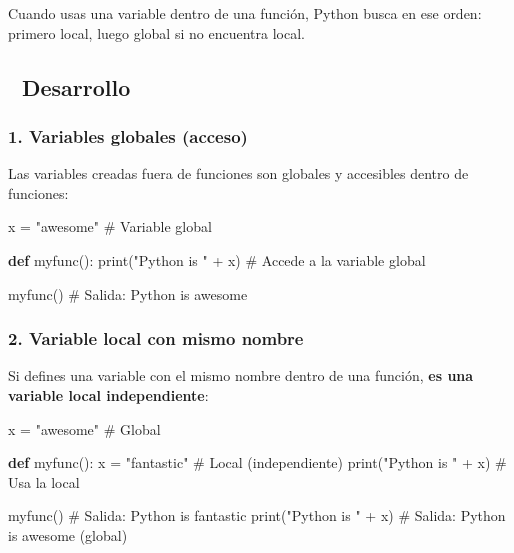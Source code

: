 \documentclass[
  doc,
  floatsintext,
  longtable,
  a4paper,
  nolmodern,
  notxfonts,
  notimes,
  12pt,
  colorlinks=true,linkcolor=blue,citecolor=blue,urlcolor=blue]{apa7}
\newenvironment{Shaded}{\begin{snugshade}}{\end{snugshade}}
\newcommand{\BuiltInTok}[1]{\textcolor[rgb]{0.00,0.23,0.31}{#1}}
\newcommand{\CommentTok}[1]{\textcolor[rgb]{0.37,0.37,0.37}{#1}}
\newcommand{\KeywordTok}[1]{\textcolor[rgb]{0.00,0.23,0.31}{\textbf{#1}}}
\newcommand{\NormalTok}[1]{\textcolor[rgb]{0.00,0.23,0.31}{#1}}
\newcommand{\OperatorTok}[1]{\textcolor[rgb]{0.37,0.37,0.37}{#1}}
\newcommand{\StringTok}[1]{\textcolor[rgb]{0.13,0.47,0.30}{#1}}
\begin{document}
Cuando usas una variable dentro de una función, Python busca en ese
orden: primero local, luego global si no encuentra local.

\subsection{📐 Desarrollo}\label{desarrollo}

\subsubsection{1. Variables globales
(acceso)}\label{variables-globales-acceso}

Las variables creadas fuera de funciones son globales y accesibles
dentro de funciones:

\begin{Shaded}
\begin{Highlighting}[]
\NormalTok{x }\OperatorTok{=} \StringTok{"awesome"}  \CommentTok{\# Variable global}

\KeywordTok{def}\NormalTok{ myfunc():}
    \BuiltInTok{print}\NormalTok{(}\StringTok{"Python is "} \OperatorTok{+}\NormalTok{ x)  }\CommentTok{\# Accede a la variable global}

\NormalTok{myfunc()  }\CommentTok{\# Salida: Python is awesome}
\end{Highlighting}
\end{Shaded}

\subsubsection{2. Variable local con mismo
nombre}\label{variable-local-con-mismo-nombre}

Si defines una variable con el mismo nombre dentro de una función,
\textbf{es una variable local independiente}:

\begin{Shaded}
\begin{Highlighting}[]
\NormalTok{x }\OperatorTok{=} \StringTok{"awesome"}  \CommentTok{\# Global}

\KeywordTok{def}\NormalTok{ myfunc():}
\NormalTok{    x }\OperatorTok{=} \StringTok{"fantastic"}  \CommentTok{\# Local (independiente)}
    \BuiltInTok{print}\NormalTok{(}\StringTok{"Python is "} \OperatorTok{+}\NormalTok{ x)  }\CommentTok{\# Usa la local}

\NormalTok{myfunc()  }\CommentTok{\# Salida: Python is fantastic}
\BuiltInTok{print}\NormalTok{(}\StringTok{"Python is "} \OperatorTok{+}\NormalTok{ x)  }\CommentTok{\# Salida: Python is awesome (global)}
\end{Highlighting}
\end{Shaded}
\end{document}
